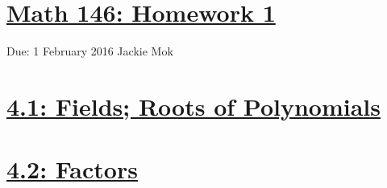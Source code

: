 \documentclass{article}
\begin{document}
\section*{\underline{Math 146: Homework 1}}
Due: 1 February 2016
\newline Jackie Mok

\vspace{10 mm}

\section*{\underline{4.1: Fields; Roots of Polynomials}}





\vspace{5 mm}

\section*{\underline{4.2: Factors}}







\end{document}
